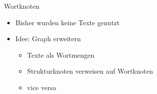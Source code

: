 \begin{frame}{Wortknoten}
    \begin{itemize}
        \item Bisher wurden keine Texte genutzt
        \item Idee: Graph erweitern
        \begin{itemize}
            \item Texte als Wortmengen
            \item Strukturknoten verweisen auf Wortknoten
            \item vice versa
        \end{itemize}
    \end{itemize}
\end{frame}

